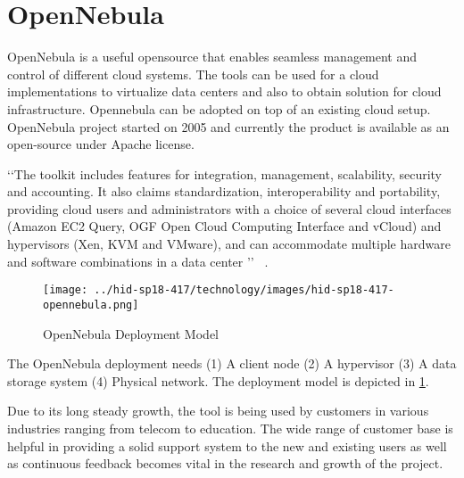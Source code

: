 
\section{OpenNebula}

OpenNebula is a useful opensource that enables seamless management and
control of different cloud systems.  The tools can be used for a cloud
implementations to virtualize data centers and also to obtain solution
for cloud infrastructure.  Opennebula can be adopted on top of an
existing cloud setup.  OpenNebula project started on 2005 and
currently the product is available as an open-source under Apache
license.

‘‘The toolkit includes features for integration, management,
scalability, security and accounting.  It also claims standardization,
interoperability and portability, providing cloud users and
administrators with a choice of several cloud interfaces (Amazon EC2
Query, OGF Open Cloud Computing Interface and vCloud) and hypervisors
(Xen, KVM and VMware), and can accommodate multiple hardware and
software combinations in a data center ’’
~\cite{hid-sp18-417-opennebula-wiki}.

\begin{figure}[htb]
\texttt{[image: ../hid-sp18-417/technology/images/hid-sp18-417-opennebula.png]}
\caption{OpenNebula Deployment Model ~\cite{hid-sp18-417-opennebula-deployment}} 
\label{F:opennebula}
\end{figure}

The OpenNebula deployment needs (1) A client node (2) A hypervisor (3)
A data storage system (4) Physical network. The deployment model is
depicted in \ref{F:opennebula}.

Due to its long steady growth, the tool is being used by customers in
various industries ranging from telecom to education.  The wide range
of customer base is helpful in providing a solid support system to the
new and existing users as well as continuous feedback becomes vital in
the research and growth of the project.


